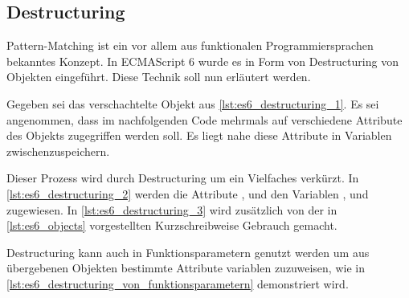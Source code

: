 \subsection{Destructuring}
\label{ssec:ge_destructuring}

Pattern-Matching ist ein vor allem aus funktionalen Programmiersprachen
bekanntes Konzept.  In ECMAScript 6 wurde es in Form von Destructuring von
Objekten eingeführt.  Diese Technik soll nun erläutert werden.

Gegeben sei das verschachtelte Objekt  aus
\cref{lst:es6_destructuring_1}.  Es sei angenommen, dass im nachfolgenden Code
mehrmals auf verschiedene Attribute des Objekts zugegriffen werden soll.
Es liegt nahe diese Attribute in Variablen zwischenzuspeichern.



Dieser Prozess wird durch Destructuring um ein Vielfaches verkürzt.  In
\cref{lst:es6_destructuring_2} werden die Attribute ,  und
 den Variablen ,  und 
zugewiesen.  In \cref{lst:es6_destructuring_3} wird zusätzlich von der in
\cref{lst:es6_objects} vorgestellten Kurzschreibweise Gebrauch gemacht.





Destructuring kann auch in Funktionsparametern genutzt werden um aus übergebenen
Objekten bestimmte Attribute variablen zuzuweisen, wie in
\cref{lst:es6_destructuring_von_funktionsparametern} demonstriert wird.


